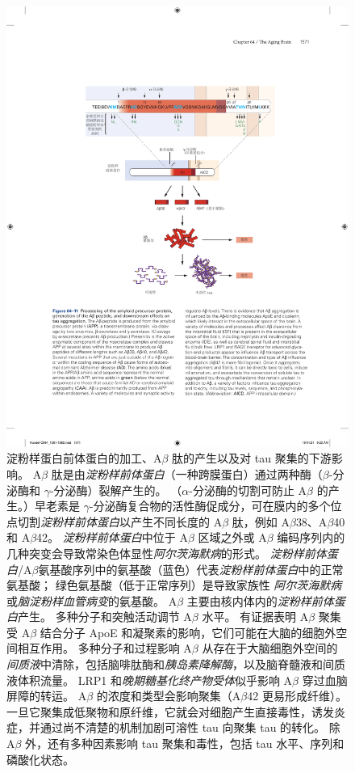 \begin{figure}[htbp]
	\centering
	\includegraphics[width=0.93\linewidth]{chap64/fig_64_11}
	\caption{淀粉样蛋白前体蛋白的加工、A$\beta$ 肽的产生以及对 tau 聚集的下游影响。
		A$\beta$ 肽是由\textit{淀粉样前体蛋白}（一种跨膜蛋白）通过两种酶（$\beta$-分泌酶和 $\gamma$-分泌酶）裂解产生的。
		（$\alpha$-分泌酶的切割可防止 A$\beta$ 的产生。）早老素是 $\gamma$-分泌酶复合物的活性酶促成分，可在膜内的多个位点切割\textit{淀粉样前体蛋白}以产生不同长度的 A$\beta$ 肽，例如 A$\beta$38、A$\beta$40 和 A$\beta$42。
		\textit{淀粉样前体蛋白}中位于 A$\beta$ 区域之外或 A$\beta$ 编码序列内的几种突变会导致常染色体显性\textit{阿尔茨海默病}的形式。 
		\textit{淀粉样前体蛋白}/A$\beta$氨基酸序列中的氨基酸（蓝色）代表\textit{淀粉样前体蛋白}中的正常氨基酸；
		绿色氨基酸（低于正常序列）是导致家族性 \textit{阿尔茨海默病}或\textit{脑淀粉样血管病变}的氨基酸。
		A$\beta$ 主要由核内体内的\textit{淀粉样前体蛋白}产生。
		多种分子和突触活动调节 A$\beta$ 水平。
		有证据表明 A$\beta$ 聚集受 A$\beta$ 结合分子 ApoE 和凝聚素的影响，它们可能在大脑的细胞外空间相互作用。
		多种分子和过程影响 A$\beta$ 从存在于大脑细胞外空间的\textit{间质液}中清除，包括脑啡肽酶和\textit{胰岛素降解酶}，以及脑脊髓液和间质液体积流量。
		LRP1 和\textit{晚期糖基化终产物受体}似乎影响 A$\beta$ 穿过血脑屏障的转运。
		A$\beta$ 的浓度和类型会影响聚集（A$\beta$42 更易形成纤维）。
		一旦它聚集成低聚物和原纤维，它就会对细胞产生直接毒性，诱发炎症，并通过尚不清楚的机制加剧可溶性 tau 向聚集 tau 的转化。
		除 A$\beta$ 外，还有多种因素影响 tau 聚集和毒性，包括 tau 水平、序列和磷酸化状态。}
	\label{fig:64_11}
\end{figure}


